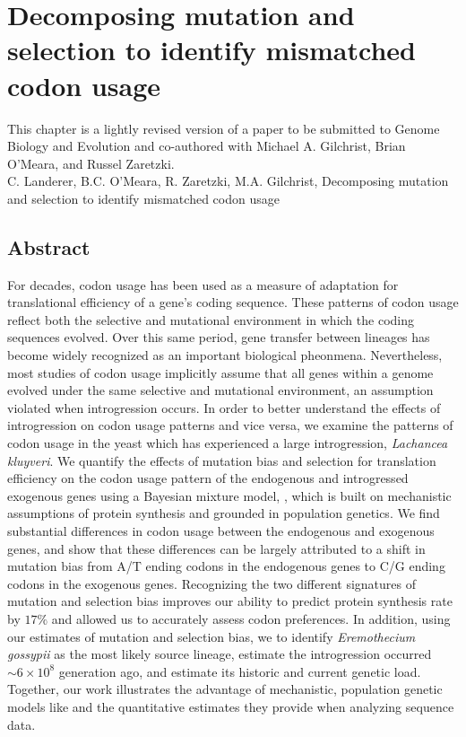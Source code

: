 \chapter{Decomposing mutation and selection to identify mismatched codon usage}
\label{ch:kluyveri}

\clearpage
\pagebreak

This chapter is a lightly revised version of a paper to be submitted to Genome Biology and Evolution and co-authored with Michael A. Gilchrist, Brian O'Meara, and Russel Zaretzki.\\
\newline
\newline
C. Landerer, B.C. O'Meara, R. Zaretzki, M.A. Gilchrist, Decomposing mutation and selection to identify mismatched codon usage

\section{Abstract}
For decades, codon usage has been used as a measure of adaptation for translational efficiency of a gene's coding sequence.
These patterns of codon usage reflect both the selective and mutational environment in which the coding sequences evolved.
Over this same period, gene transfer between lineages has become widely recognized as an important biological pheonmena.
Nevertheless, most studies of codon usage implicitly assume that all genes within a genome evolved under the same selective and mutational environment, an assumption violated when introgression occurs. %
In order to better understand the effects of introgression on codon usage patterns and vice versa,  we examine the patterns of codon usage in the yeast which has experienced a large introgression, \textit{Lachancea kluyveri}.
We quantify the effects of mutation bias and selection for translation efficiency on the codon usage pattern of the endogenous and introgressed exogenous genes using a Bayesian mixture model, \ROC, which is built on mechanistic assumptions of protein synthesis and grounded in population genetics.
We find substantial differences in codon usage between the endogenous and exogenous genes, and show that these differences can be largely attributed to a shift in mutation bias from A/T ending codons in the endogenous genes to C/G ending codons in the exogenous genes.
Recognizing the two different signatures of mutation and selection bias improves our ability to predict protein synthesis rate by $17 \%$ and allowed us to accurately assess codon preferences.
In addition, using our estimates of mutation and selection bias, we to identify \textit{Eremothecium gossypii} as the most likely source lineage, estimate the introgression occurred $\sim 6\times 10^8$ generation ago, and estimate its historic and current genetic load.
Together, our work illustrates the advantage of mechanistic, population genetic models like \ROC and the quantitative estimates they provide when analyzing sequence data.

